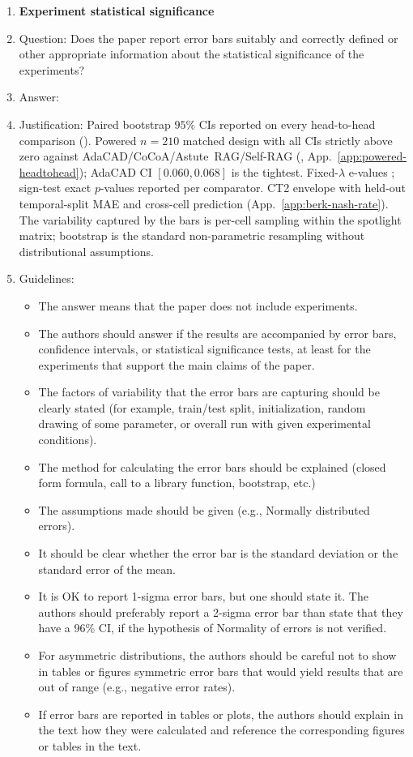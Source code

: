 \begin{enumerate}
\item \textbf{Experiment statistical significance}
    \item[] Question: Does the paper report error bars suitably and correctly defined or other appropriate information about the statistical significance of the experiments?
    \item[] Answer: \answerYes{}
    \item[] Justification: Paired bootstrap $95\%$ CIs reported on every head-to-head comparison (). Powered $n\!=\!210$ matched design with all CIs strictly above zero against AdaCAD/CoCoA/Astute~RAG/Self-RAG (, App.~\ref{app:powered-headtohead}); AdaCAD CI $[0.060,0.068]$ is the tightest. Fixed-$\lambda$ e-values \citep{shafer2021testing,ramdas2023game}; sign-test exact $p$-values reported per comparator. CT2 envelope with held-out temporal-split MAE and cross-cell prediction (App.~\ref{app:berk-nash-rate}). The variability captured by the bars is per-cell sampling within the spotlight matrix; bootstrap is the standard non-parametric resampling without distributional assumptions.
    \item[] Guidelines:
    \begin{itemize}
        \item The answer \answerNA{} means that the paper does not include experiments.
        \item The authors should answer \answerYes{} if the results are accompanied by error bars, confidence intervals, or statistical significance tests, at least for the experiments that support the main claims of the paper.
        \item The factors of variability that the error bars are capturing should be clearly stated (for example, train/test split, initialization, random drawing of some parameter, or overall run with given experimental conditions).
        \item The method for calculating the error bars should be explained (closed form formula, call to a library function, bootstrap, etc.)
        \item The assumptions made should be given (e.g., Normally distributed errors).
        \item It should be clear whether the error bar is the standard deviation or the standard error of the mean.
        \item It is OK to report 1-sigma error bars, but one should state it. The authors should preferably report a 2-sigma error bar than state that they have a 96\% CI, if the hypothesis of Normality of errors is not verified.
        \item For asymmetric distributions, the authors should be careful not to show in tables or figures symmetric error bars that would yield results that are out of range (e.g., negative error rates).
        \item If error bars are reported in tables or plots, the authors should explain in the text how they were calculated and reference the corresponding figures or tables in the text.
    \end{itemize}


\end{enumerate}
